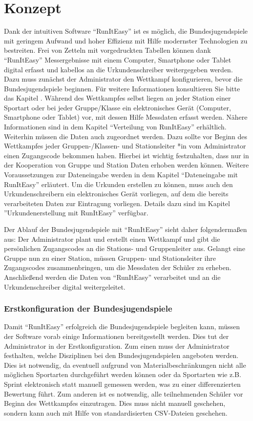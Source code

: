 \documentclass[11pt,a4paper,titlepage,german]{article}
\begin{document}
	\part{Konzept}
		Dank der intuitiven Software “RunItEasy” ist es möglich, die Bundesjugendspiele mit geringem Aufwand und hoher Effizienz mit Hilfe modernster Technologien zu bestreiten.
		Frei von Zetteln mit vorgedruckten Tabellen können dank “RunItEasy” Messergebnisse mit einem Computer, Smartphone oder Tablet digital erfasst und kabellos an die Urkundenschreiber weitergegeben werden. 
		Dazu muss zunächst der Administrator den Wettkampf konfigurieren, bevor die Bundesjugendspiele beginnen. Für weitere Informationen konsultieren Sie bitte das Kapitel .
		Während des Wettkampfes selbst liegen an jeder Station einer Sportart oder bei jeder Gruppe/Klasse ein elektronisches Gerät (Computer, Smartphone oder Tablet) vor, mit dessen Hilfe Messdaten erfasst werden. Nähere Informationen sind in dem Kapitel “Verteilung von RunItEasy” erhältlich.
		Weiterhin müssen die Daten auch zugeordnet werden. Dazu sollte vor Beginn des Wettkampfes jeder Gruppen-/Klassen- und Stationsleiter *in vom Administrator einen Zugangscode bekommen haben. Hierbei ist wichtig festzuhalten, dass nur in der Kooperation von Gruppe und Station Daten erhoben werden können. Weitere Voraussetzungen zur Dateneingabe werden in dem Kapitel “Dateneingabe mit RunItEasy” erläutert. 
		Um die Urkunden erstellen zu können, muss auch den Urkundenschreibern ein elektronisches Gerät vorliegen, auf dem die bereits verarbeiteten Daten zur Eintragung vorliegen. Details dazu sind im Kapitel ”Urkundenerstellung mit RunItEasy” verfügbar.
		
		Der Ablauf der Bundesjugendspiele mit “RunItEasy” sieht daher folgendermaßen aus:
		Der Administrator plant und erstellt einen Wettkampf und gibt die persönlichen Zugangscodes an die Stations- und Gruppenleiter aus. Gelangt eine Gruppe nun zu einer Station, müssen Gruppen- und Stationsleiter ihre Zugangscodes zusammenbringen, um die Messdaten der Schüler zu erheben. Anschließend werden die Daten von “RunItEasy” verarbeitet und an die Urkundenschreiber digital weitergeleitet.
		
		\section[Konfiguration]{Erstkonfiguration der Bundesjugendspiele}
			\label{concept:initialConfig}
			Damit “RunItEasy” erfolgreich die Bundesjugendspiele begleiten kann, müssen der Software vorab einige Informationen bereitgestellt werden. Dies tut der Administrator in der Erstkonfiguration. 
			Zum einen muss der Administrator festhalten, welche Disziplinen bei den Bundesjugendspielen angeboten werden. Dies ist notwendig, da eventuell aufgrund von Materialbeschränkungen nicht alle möglichen Sportarten durchgeführt werden können oder da Sportarten wie z.B. Sprint elektronisch statt manuell gemessen werden, was zu einer differenzierten Bewertung führt.
			Zum anderen ist es notwendig, alle teilnehmenden Schüler vor Beginn des Wettkampfes einzutragen. Dies muss nicht manuell geschehen, sondern kann auch mit Hilfe von standardisierten CSV-Dateien geschehen.
			
\end{document}
